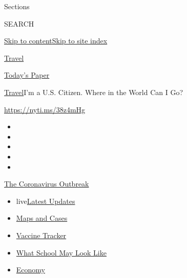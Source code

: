 Sections

SEARCH

\protect\hyperlink{site-content}{Skip to
content}\protect\hyperlink{site-index}{Skip to site index}

\href{https://www.nytimes.com/section/travel}{Travel}

\href{https://myaccount.nytimes.com/auth/login?response_type=cookie\&client_id=vi}{}

\href{https://www.nytimes.com/section/todayspaper}{Today's Paper}

\href{/section/travel}{Travel}\textbar{}I'm a U.S. Citizen. Where in the
World Can I Go?

\url{https://nyti.ms/38z4mHg}

\begin{itemize}
\item
\item
\item
\item
\item
\end{itemize}

\href{https://www.nytimes.com/news-event/coronavirus?action=click\&pgtype=Article\&state=default\&region=TOP_BANNER\&context=storylines_menu}{The
Coronavirus Outbreak}

\begin{itemize}
\tightlist
\item
  live\href{https://www.nytimes.com/2020/08/01/world/coronavirus-covid-19.html?action=click\&pgtype=Article\&state=default\&region=TOP_BANNER\&context=storylines_menu}{Latest
  Updates}
\item
  \href{https://www.nytimes.com/interactive/2020/us/coronavirus-us-cases.html?action=click\&pgtype=Article\&state=default\&region=TOP_BANNER\&context=storylines_menu}{Maps
  and Cases}
\item
  \href{https://www.nytimes.com/interactive/2020/science/coronavirus-vaccine-tracker.html?action=click\&pgtype=Article\&state=default\&region=TOP_BANNER\&context=storylines_menu}{Vaccine
  Tracker}
\item
  \href{https://www.nytimes.com/interactive/2020/07/29/us/schools-reopening-coronavirus.html?action=click\&pgtype=Article\&state=default\&region=TOP_BANNER\&context=storylines_menu}{What
  School May Look Like}
\item
  \href{https://www.nytimes.com/live/2020/07/31/business/stock-market-today-coronavirus?action=click\&pgtype=Article\&state=default\&region=TOP_BANNER\&context=storylines_menu}{Economy}
\end{itemize}

